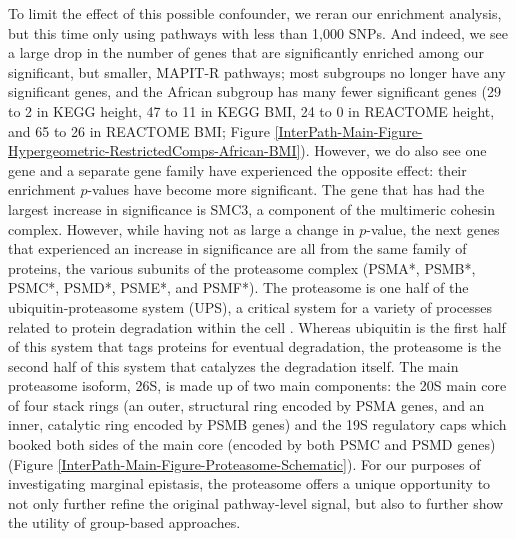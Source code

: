 \documentclass[12pt,a4paper]{article}
\begin{document}
To limit the effect of this possible confounder, we reran our enrichment analysis, but this time only using pathways with less than 1,000 SNPs. And indeed, we see a large drop in the number of genes that are significantly enriched among our significant, but smaller, MAPIT-R pathways; most subgroups no longer have any significant genes, and the African subgroup has many fewer significant genes (29 to 2 in KEGG height, 47 to 11 in KEGG BMI, 24 to 0 in REACTOME height, and 65 to 26 in REACTOME BMI; Figure \ref{InterPath-Main-Figure-Hypergeometric-RestrictedComps-African-BMI}). However, we do also see one gene and a separate gene family  have experienced the opposite effect: their enrichment $p$-values have become more significant. The gene that has had the largest increase in significance is SMC3, a component of the multimeric cohesin complex. However, while having not as large a change in $p$-value, the next genes that experienced an increase in significance are all from the same family of proteins, the various subunits of the proteasome complex (PSMA*, PSMB*, PSMC*, PSMD*, PSME*, and PSMF*). The proteasome is one half of the ubiquitin-proteasome system (UPS), a critical system for a variety of processes related to protein degradation within the cell \citep{Voges1999,Livneh2016,Collins2017}. Whereas ubiquitin is the first half of this system that tags proteins for eventual degradation, the proteasome is the second half of this system that catalyzes the degradation itself. The main proteasome isoform, 26S, is made up of two main components: the 20S main core of four stack rings (an outer, structural ring encoded by PSMA genes, and an inner, catalytic ring encoded by PSMB genes) and the 19S regulatory caps which booked both sides of the main core (encoded by both PSMC and PSMD genes) (Figure \ref{InterPath-Main-Figure-Proteasome-Schematic}). For our purposes of investigating marginal epistasis, the proteasome offers a unique opportunity to not only further refine the original pathway-level signal, but also to further show the utility of group-based approaches.
\end{document}
